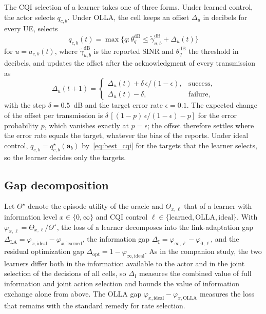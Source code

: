 \documentclass{ieeeaccess}
\begin{document}
The CQI selection of a learner takes one of three forms. Under learned control, the actor selects $q_{c,b}$. Under OLLA, the cell keeps an offset $\Delta_u$ in decibels for every UE, selects
\begin{equation}
q_{c,b}(t) = \max\{ q : \theta_q^{\text{dB}} \le \tilde{\gamma}^{\text{dB}}_{u,b} + \Delta_u(t) \}
\label{eq:olla_select}
\end{equation}
for $u = a_{c,b}(t)$, where $\tilde{\gamma}^{\text{dB}}_{u,b}$ is the reported SINR and $\theta_q^{\text{dB}}$ the threshold in decibels, and updates the offset after the acknowledgment of every transmission as
\begin{equation}
\Delta_u(t+1) =
\begin{cases}
\Delta_u(t) + \delta\, \epsilon/(1 - \epsilon), & \text{success}, \\
\Delta_u(t) - \delta, & \text{failure},
\end{cases}
\label{eq:olla_update}
\end{equation}
with the step $\delta = 0.5$~dB and the target error rate $\epsilon = 0.1$. The expected change of the offset per transmission is $\delta\,[(1 - p)\,\epsilon/(1 - \epsilon) - p]$ for the error probability $p$, which vanishes exactly at $p = \epsilon$; the offset therefore settles where the error rate equals the target, whatever the bias of the reports. Under ideal control, $q_{c,b} = q^{\star}_{c,b}(\mathbf{a}_b)$ by~\eqref{eq:best_cqi} for the targets that the learner selects, so the learner decides only the targets.

\subsection{Gap decomposition}
Let $\Theta^{\star}$ denote the episode utility of the oracle and $\Theta_{x,\ell}$ that of a learner with information level $x \in \{0, \infty\}$ and CQI control $\ell \in \{\text{learned}, \text{OLLA}, \text{ideal}\}$. With $\varphi_{x,\ell} = \Theta_{x,\ell}/\Theta^{\star}$, the loss of a learner decomposes into the link-adaptation gap $\Delta_{\text{LA}} = \varphi_{x,\text{ideal}} - \varphi_{x,\text{learned}}$, the information gap $\Delta_{\text{I}} = \varphi_{\infty,\ell} - \varphi_{0,\ell}$, and the residual optimization gap $\Delta_{\text{opt}} = 1 - \varphi_{\infty,\text{ideal}}$. As in the companion study, the two learners differ both in the information available to the actor and in the joint selection of the decisions of all cells, so $\Delta_{\text{I}}$ measures the combined value of full information and joint action selection and bounds the value of information exchange alone from above. The OLLA gap $\varphi_{x,\text{ideal}} - \varphi_{x,\text{OLLA}}$ measures the loss that remains with the standard remedy for rate selection.
\end{document}
